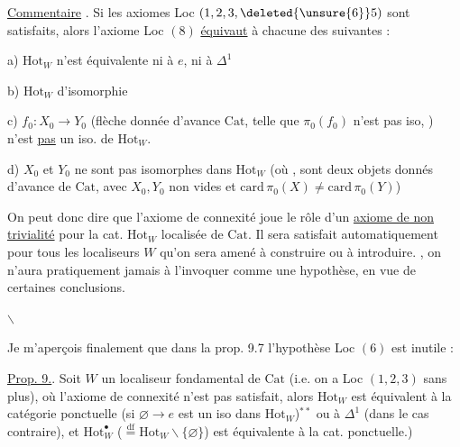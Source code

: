 

\uline{Commentaire} . Si les axiomes Loc $(1,2,3,\deleted{\unsure{6}}5)$\unsure{$^{*}$} sont satisfaits, alors l'axiome  Loc $(8)$ \uline{équivaut} à chacune des suivantes :

a) $\mathrm{Hot}_W$ n'est équivalente ni à $e$, ni à $\Delta^1$

b) $\mathrm{Hot}_W$  d'isomorphie

c)  $f_0:X_0\to Y_0$ (flèche donnée d'avance  $\mathrm{Cat}$, telle que $\pi_0(f_0)$ n'est pas iso, ) n'est \uline{pas} un iso. de $\mathrm{Hot}_W$.

d) $X_0$ et $Y_0$ ne sont pas isomorphes dans $\mathrm{Hot}_W$ (où ,  sont deux objets donnés d'avance de $\mathrm{Cat}$, avec $X_0,Y_0$ non vides et $\mathrm{card}\,\pi_0(X)\ne\mathrm{card}\,\pi_0(Y)$)

\margin{\rule[-3\baselineskip]{0.4pt}{4\baselineskip}\hspace{1.4pt}\rule[-3.15\baselineskip]{0.4pt}{4.15\baselineskip}}

On peut donc dire que l'axiome de connexité joue le rôle d'un \uline{axiome de non trivialité} pour la cat. $\mathrm{Hot}_W$ localisée de $\mathrm{Cat}$. Il sera satisfait automatiquement pour tous les localiseurs  $W$ qu'on sera amené à construire ou à introduire. , on n'aura pratiquement jamais à l'invoquer comme une hypothèse, en vue de certaines conclusions.

$\backslash$

Je m'aperçois finalement que dans la prop. 9.7 l'hypothèse Loc $(6)$ est inutile :



\uline{Prop. 9.}. Soit $W$ un localiseur fondamental de $\mathrm{Cat}$ (i.e. on a Loc $(1,2,3)$ sans plus),  où l'axiome de connexité n'est pas satisfait, alors $\mathrm{Hot}_W$ est équivalent à la catégorie ponctuelle (si $\varnothing\to e$ est un iso dans $\mathrm{Hot}_W$)$^{**}$ ou à $\Delta^1$ (dans le cas contraire), et $\mathrm{Hot}^{\bullet}_W$ ($\overset{\mathrm{df}}{=}\mathrm{Hot}_W\smallsetminus\{\varnothing\}$) est équivalente à la cat. ponctuelle.)

